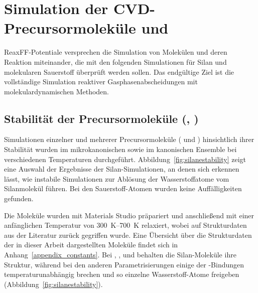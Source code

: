 \chapter{Simulation der CVD-Precursormoleküle  und }
\label{appendix_silica}

ReaxFF-Potentiale versprechen die Simulation von Molekülen und deren Reaktion miteinander, die mit den folgenden Simulationen für Silan und molekularen Sauerstoff überprüft werden sollen.
Das endgültige Ziel ist die vollständige Simulation reaktiver Gasphasenabscheidungen mit molekulardynamischen Methoden.

\section{Stabilität der Precursormoleküle (, )}

Simulationen einzelner und mehrerer Precursormoleküle ( und ) hinsichtlich ihrer Stabilität wurden im mikrokanonischen sowie im kanonischen Ensemble bei verschiedenen Temperaturen durchgeführt.
Abbildung~\ref{fig:silanestability} zeigt eine Auswahl der Ergebnisse der Silan-Simulationen, an denen sich erkennen lässt, wie instabile Simulationen zur Ablösung der Wasserstoffatome vom Silanmolekül führen.
Bei den Sauerstoff-Atomen wurden keine Auffälligkeiten gefunden.

Die Moleküle wurden mit Materials Studio\cite{biovia_materials_2014} präpariert und anschließend mit einer anfänglichen Temperatur von \SIrange{300}{700}{\kelvin} relaxiert, wobei auf Strukturdaten aus der Literatur zurück gegriffen wurde\cite{haynes_crc_2011}.
Eine Übersicht über die Strukturdaten der in dieser Arbeit dargestellten Moleküle findet sich in Anhang~\ref{appendix_constants}.
Bei , ,  und  behalten die Silan-Moleküle ihre Struktur, während bei den anderen Parametrisierungen einige der -Bindungen temperaturunabhängig brechen und so einzelne Wasserstoff-Atome freigeben (Abbildung~\ref{fig:silanestability}).

